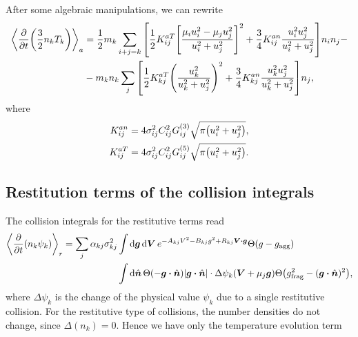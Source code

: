 \documentclass[aps,prl,preprint,groupedaddress,10pt]{revtex4-2}
\begin{document}
After some algebraic manipulations, we can rewrite
\begin{equation}
    \begin{split}
        \avg{\pdv{t}\pqty{\frac{3}{2}n_k T_k}}_a&=\frac{1}{2}m_k\sum_{i+j=k}
        \bqty{\frac{1}{2}K^{aT}_{ij}\bqty{\frac{\mu_iu_i^2-\mu_ju_j^2}{u_i^2+u_j^2}}^2+
        \frac{3}{4}K^{an}_{ij}\frac{u_i^2u_j^2}{u_i^2+u_j^2}}n_in_j-\\
        &-m_kn_k\sum_{j}\bqty{\frac{1}{2}K^{aT}_{kj}\pqty{\frac{u_{k}^2}{u_{k}^2+u_{j}^2}}^2+
        \frac{3}{4}K^{an}_{kj}\frac{u_k^2u_j^2}{u_k^2+u_j^2}}n_j,
    \end{split}
\end{equation}
where
\begin{equation}
    \begin{split}
        K^{an}_{ij}&=4\sigma_{ij}^2C_{ij}^2G^{(3)}_{ij}\sqrt{\pi\pqty{u_i^2+u_j^2}},\\
        K^{aT}_{ij}&=4\sigma_{ij}^2C_{ij}^2G^{(5)}_{ij}\sqrt{\pi\pqty{u_i^2+u_j^2}}.
    \end{split}
\end{equation}



\subsection{Restitution terms of the collision integrals}
The collision integrals for the restitutive terms read
\begin{equation}
    \begin{split}
        \avg{\pdv{t}(n_k\psi_k)}_r=\sum_{j}\alpha_{kj}\sigma_{kj}^2&\int
        \dd{\bg}\dd{\bV}e^{-A_{kj}V^2-B_{kj}g^2+R_{kj}\bV\vdot\bg}\Theta(g-\ltx{g}{agg})\\
        &\int\dd{\bn}\Theta\pqty{-\bg\vdot\bn}\abs{\bg\vdot\bn}\cdot
        \Delta\psi_k(\bV+\mu_j\bg)\Theta\pqty{\ltx{g}{frag}^2-(\bg\vdot\bn)^2},
    \end{split}
\end{equation}
where $\Delta\psi_k$ is the change of the physical value $\psi_k$ due to a single
restitutive collision. For the restitutive type of collisions, the number densities do not
change, since $\Delta(n_k)=0$. Hence we have only the temperature evolution term
\end{document}
